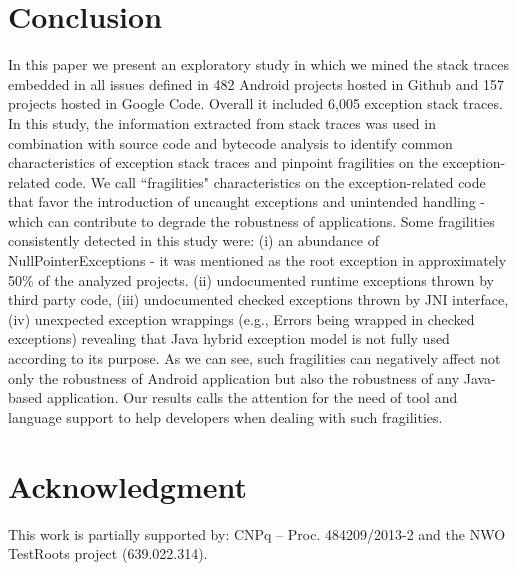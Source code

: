 \documentclass[conference]{IEEEtran}
\begin{document}
\enlargethispage{-2\baselineskip}

\section{Conclusion}
\label{sec:conc}

In this paper we present an exploratory study in which we mined the stack 
traces embedded in all issues defined in 482 Android projects hosted in Github and 
157 projects hosted in Google Code. Overall it included 6,005 exception stack traces.
In this study, the information extracted from stack traces was used in combination 
with source code and bytecode analysis to identify common characteristics of exception 
stack traces and pinpoint fragilities on the exception-related code. 
We call ``fragilities" characteristics on the exception-related code that favor the introduction
of  uncaught exceptions and unintended handling - which can contribute to 
degrade the robustness of applications.
Some fragilities consistently detected in this study were: 
(i) an abundance of NullPointerExceptions - it was mentioned as the root exception in approximately 
50\% of the analyzed projects. 
(ii) undocumented runtime exceptions thrown by third party code,
(iii) undocumented checked exceptions thrown by JNI interface,
(iv) unexpected exception wrappings (e.g., Errors being wrapped in checked exceptions) 
revealing that Java hybrid exception model is not fully used according to its purpose.
As we can see, such fragilities can negatively affect not only the robustness of Android application 
but also the robustness of any Java-based application. 
Our results calls the attention for the need of tool and language support to help 
developers when dealing with such fragilities.

 



\section*{Acknowledgment} This work is partially supported by: CNPq -- Proc.
484209/2013-2 and the NWO TestRoots project (639.022.314).





\end{document}
